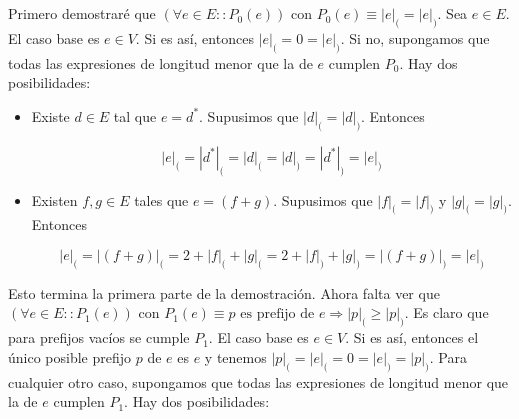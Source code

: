 \documentclass{article}
\begin{document}
\section{}

Primero demostraré que $(\forall e \in E :: P_0(e))$ con
$P_0(e) \equiv |e|_( = |e|_)$. Sea $e \in E$. El
caso base es $e \in V$. Si es así, entonces $|e|_( = 0 = |e|_)$. Si no,
supongamos que todas las expresiones de longitud menor que la de $e$ cumplen
$P_0$. Hay dos posibilidades:

\begin{itemize}
\item Existe $d \in E$ tal que $e = d^*$. Supusimos que $|d|_( = |d|_)$.
Entonces

$$|e|_( = |d^*|_( = |d|_( = |d|_) = |d^*|_) = |e|_)$$

\item Existen $f,g \in E$ tales que $e = (f+g)$. Supusimos que
$|f|_( = |f|_)$ y $|g|_( = |g|_)$. Entonces

$$
|e|_( = |(f+g)|_( = 2 + |f|_( + |g|_( = 2 + |f|_) + |g|_) = |(f+g)|_) = |e|_)
$$

\end{itemize}

Esto termina la primera parte de la demostración. Ahora falta ver que
$(\forall e \in E :: P_1(e))$
con
$P_1(e) \equiv p \text{ es prefijo de } e \Rightarrow |p|_( \geq |p|_)$.
Es claro que para prefijos vacíos se cumple $P_1$.
El caso base es $e \in V$. Si es así, entonces el único posible prefijo $p$ de
$e$ es $e$ y tenemos $|p|_( = |e|_( = 0 = |e|_) = |p|_)$. Para cualquier otro
caso, supongamos que todas las expresiones de longitud menor que la de $e$
cumplen $P_1$. Hay dos posibilidades:
\end{document}
